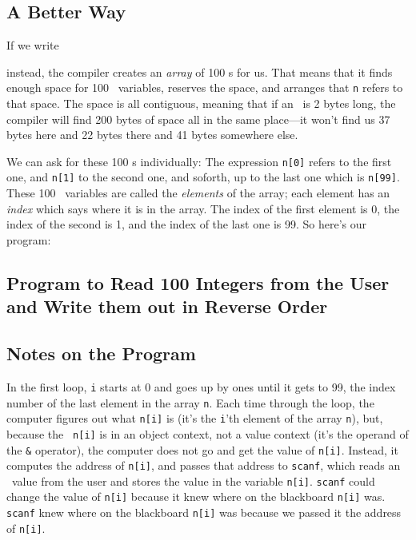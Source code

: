 \subsection{A Better Way}

If we write

\begin{flushleft}
\verb% int n[100]; %
\end{flushleft}

\noindent instead, the compiler creates an {\em array}\/ of 100 \int s for
us.  That means that it finds enough space for 100 \int\ variables,
reserves the space, and arranges that {\tt n} refers to that space.  The
space is all contiguous, meaning that if an \int\ is 2 bytes long, the
compiler will find 200 bytes of space all in the same place---it won't
find us 37 bytes here and 22 bytes there and 41 bytes somewhere else.  

We can ask for these 100 \int s individually: The expression {\tt n[0]}
refers to the first one, and {\tt n[1]} to the second one, and soforth,
up to the last one which is {\tt n[99]}.  These 100 \int\ variables are
called the {\em elements}\/ of the array; each element has an {\em
index} which says where it is in the array.  The index of the first
element is 0, the index of the second is 1, and the index of the last
one is 99.  So here's our program:

\subsection{Program to Read 100 Integers from the User and Write them out in Reverse Order}



\subsection{Notes on the Program}


In the first loop, {\tt i} starts at 0 and goes up by ones until it gets
to 99, the index number of the last element in the array {\tt n}.  Each
time through the loop, the computer figures out what {\tt n[i]} is (it's
the {\tt i}'th element of the array {\tt n}), but, because the {\tt
n[i]} is in an object context, not a value context (it's the operand of
the {\tt\&} operator), the computer does not go and get the value of
{\tt n[i]}.  Instead, it computes the address of {\tt n[i]}, and passes
that address to {\tt scanf}, which reads an \int\ value from the user
and stores the value in the variable {\tt n[i]}.  {\tt scanf} could
change the value of {\tt n[i]} because it knew where on the blackboard
{\tt n[i]} was.  {\tt scanf} knew where on the blackboard {\tt n[i]} was
because we passed it the address of {\tt n[i]}.

